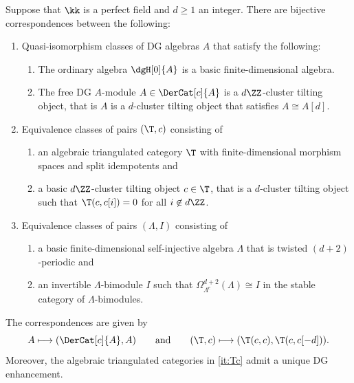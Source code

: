 \documentclass[a4paper]{amsart}
\begin{document}
\begin{theorem intro}
  \label{thm:dZ-Auslander_correspondence}
  Suppose that $\kk$ is a perfect field and $d\geq1$ an integer. There are
  bijective correspondences between the following:
  \begin{enumerate}
  \item\label{it:dZ-CT_DGAs} Quasi-isomorphism classes of DG algebras $A$ that
    satisfy the following:
    \begin{enumerate}
    \item The ordinary algebra $\dgH[0]{A}$ is a basic finite-dimensional algebra.
    \item The free DG $A$-module $A\in\DerCat[c]{A}$ is a $d\ZZ$-cluster tilting
      object, that is $A$ is a $d$-cluster tilting object that satisfies $A\cong A[d]$.
    \end{enumerate}        
  \item\label{it:Tc} Equivalence classes of pairs $(\T,c)$ consisting of
    \begin{enumerate}
    \item an algebraic triangulated category $\T$ with finite-dimensional
      morphism spaces and split idempotents and
    \item a basic $d\ZZ$-cluster tilting object $c\in\T$, that is a $d$-cluster
      tilting object such that $\T(c,c[i])=0$ for all $i\not\in d\ZZ$.
    \end{enumerate}
  \item\label{it:pairsLambdaI} Equivalence classes of pairs $(\Lambda,I)$
    consisting of
    \begin{enumerate}
    \item a basic finite-dimensional self-injective algebra $\Lambda$ that is
      twisted $(d+2)$-periodic and
    \item an invertible $\Lambda$-bimodule $I$ such that
      $\Omega_{\Lambda^e}^{d+2}(\Lambda)\cong I$ in the stable category of
      $\Lambda$-bimodules.
    \end{enumerate}
  \end{enumerate}
  The correspondences are given by
  \[
    A\longmapsto (\DerCat[c]{A},A)\qquad\text{and}\qquad(\T,c)\longmapsto (\T(c,c),\T(c,c[-d])).
  \]
  Moreover, the algebraic triangulated
  categories in \eqref{it:Tc} admit a unique DG enhancement.
\end{theorem intro}
\end{document}
